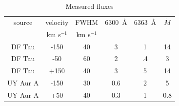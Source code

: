 \documentclass[twocolumn,trackchanges]{aastex63}
\begin{document}
\begin{table}
\caption{Measured fluxes\label{tab:flux}}
\begin{center}
\begin{tabular}{cccccc}
\hline\hline
source & velocity & FWHM & 6300~\AA{} & 6363~\AA{} & $\dot M$\\ 
       & km s$^{-1}$ & km s$^{-1}$ & \tablenotemark{a} & \tablenotemark{a} & \tablenotemark{b}\\
\hline
DF Tau & -150 & 40 & 3 & 1 &  14\\
DF Tau & -50 & 60 & 2 & .4 & 3\\
DF Tau & +150 & 40 & 3 & 5 & 14\\
UY Aur A & -150 & 30 & 0.6 & 2 & 5\\
UY Aur A & +50 & 40 & 0.3 & 1 & 0.8\\
\end{tabular}
\end{center}
\end{table}
\end{document}
